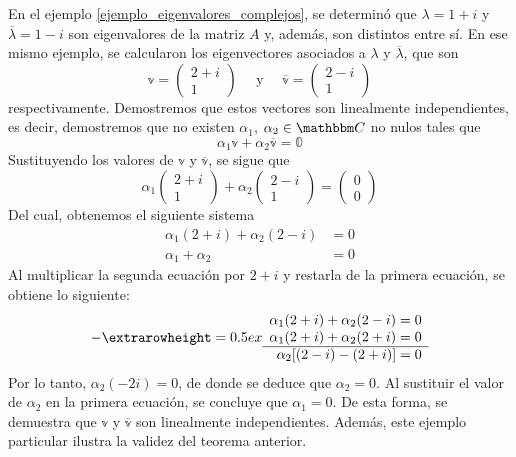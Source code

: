 \begin{example}
    En el ejemplo \ref{ejemplo_eigenvalores_complejos}, se determinó que $\lambda = 1 + i$ y $\overline{\lambda} = 1 - i$ son eigenvalores de la matriz $A$ y, además, son distintos entre sí. En ese mismo ejemplo, se calcularon los eigenvectores asociados a $\lambda$ y $\overline{\lambda}$, que son
    $$\mathbb{v} = \begin{pmatrix} 2 + i \\ 1 \end{pmatrix} \quad \text{ y } \quad \overline{\mathbb{v}} = \begin{pmatrix} 2 - i \\ 1 \end{pmatrix}$$
    respectivamente. Demostremos que estos vectores son linealmente independientes, es decir, demostremos que no existen $\alpha_1$, $\alpha_2 \in \CC$ no nulos tales que
    $$\alpha_1 \mathbb{v} + \alpha_2 \overline{\mathbb{v}} = \mathbb{0}$$
    Sustituyendo los valores de $\mathbb{v}$ y $\overline{\mathbb{v}}$, se sigue que
    $$\alpha_1 \begin{pmatrix} 2 + i \\ 1 \end{pmatrix} + \alpha_2 \begin{pmatrix} 2 - i \\ 1 \end{pmatrix} = \begin{pmatrix} 0 \\ 0 \end{pmatrix}$$
    Del cual, obtenemos el siguiente sistema
    \begin{align*}
        \alpha_1 (2 + i) + \alpha_2 (2 - i) & = 0 \\
        \alpha_1 + \alpha_2 & = 0
    \end{align*}
    Al multiplicar la segunda ecuación por $2 + i$ y restarla de la primera ecuación, se obtiene lo siguiente:
    $$- {\extrarowheight = 0.5ex
    \begin{array}{r}
        \alpha_1 (2 + i) + \alpha_2 (2 - i) = 0 \\
        \alpha_1(2 + i) + \alpha_2(2 + i) = 0 \\
        \hline
        \alpha_2 [(2 - i) - (2 + i)] = 0
    \end{array}}$$
    Por lo tanto, $\alpha_2(-2i) = 0$, de donde se deduce que $\alpha_2 = 0$. Al sustituir el valor de $\alpha_2$ en la primera ecuación, se concluye que $\alpha_1 = 0$. De esta forma, se demuestra que $\mathbb{v}$ y $\overline{\mathbb{v}}$ son linealmente independientes. Además, este ejemplo particular ilustra la validez del teorema anterior.
\end{example}

